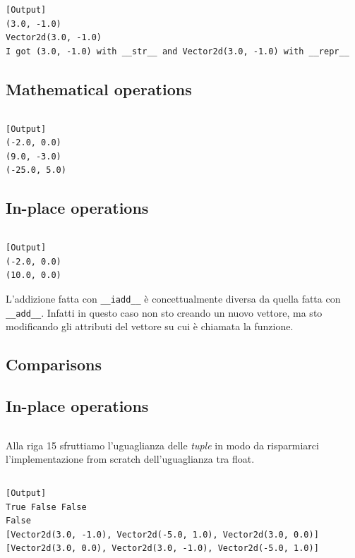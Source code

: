 \inputminted{python}{snippets/vector2d_printable.py}
\begin{verbatim}
[Output]
(3.0, -1.0)
Vector2d(3.0, -1.0)
I got (3.0, -1.0) with __str__ and Vector2d(3.0, -1.0) with __repr__
\end{verbatim}

\subsection{Mathematical operations}

\inputminted{python}{snippets/vector2d_math.py}
\begin{verbatim}
[Output]
(-2.0, 0.0)
(9.0, -3.0)
(-25.0, 5.0)
\end{verbatim}

\subsection{In-place operations}
\inputminted{python}{snippets/vector2d_inplace.py}
\begin{verbatim}
[Output]
(-2.0, 0.0)
(10.0, 0.0)
\end{verbatim}

L'addizione fatta con \texttt{\_\_iadd\_\_} è concettualmente diversa da quella fatta con \texttt{\_\_add\_\_}. Infatti in questo caso non sto creando un nuovo vettore, ma sto modificando gli attributi del vettore su cui è chiamata la funzione.

\subsection{Comparisons}

\subsection{In-place operations}
\inputminted{python}{snippets/vector2d_comparable.py}
Alla riga 15 sfruttiamo l'uguaglianza delle \textit{tuple} in modo da risparmiarci l'implementazione from scratch dell'uguaglianza tra float.
\inputminted{python}{snippets/test_vector2d_comparable.py}
\begin{verbatim}
[Output]
True False False
False
[Vector2d(3.0, -1.0), Vector2d(-5.0, 1.0), Vector2d(3.0, 0.0)]
[Vector2d(3.0, 0.0), Vector2d(3.0, -1.0), Vector2d(-5.0, 1.0)]
\end{verbatim}


